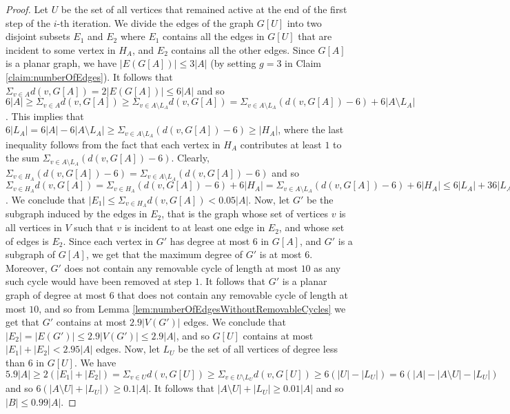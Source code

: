 \documentclass{article}
\theoremstyle{definition}
\begin{document}
\begin{proof}
Let $U$ be the set of all vertices that remained active at the end of the first step of the $i$-th iteration. We divide the edges of the graph $G[U]$ into two disjoint subsets $E_{1}$ and $E_{2}$ where $E_{1}$ contains all the edges in $G[U]$ that are incident to some vertex in $H_A$, and $E_{2}$ contains all the other edges. Since $G[A]$ is a planar graph, we have %
$|E(G[A])| \le 3|A|$ (by setting $g = 3$ in Claim \ref{claim:numberOfEdges}). It follows that $\Sigma_{v \in A}d(v, G[A]) = 2|E(G[A])| \le 6|A|$ and so $6|A| \ge \Sigma_{v \in A}d(v, G[A]) \ge \Sigma_{v \in A \setminus L_A} d(v, G[A]) = \Sigma_{v \in A \setminus L_A} (d(v, G[A]) - 6) + 6|A \setminus L_A|$. This implies that $6|L_A| = 6|A| - 6|A \setminus L_A| \ge \Sigma_{v \in A \setminus L_A} (d(v, G[A]) - 6) \ge |H_A|$, where the last inequality follows from the fact that each vertex in $H_A$ contributes at least $1$ to the sum $\Sigma_{v \in A \setminus L_A} (d(v, G[A]) - 6)$. Clearly, $\Sigma_{v \in H_A}(d(v, G[A]) - 6) = \Sigma_{v \in A \setminus L_A}(d(v, G[A]) - 6)$ and so $\Sigma_{v \in H_A}d(v, G[A]) = \Sigma_{v \in H_A}(d(v, G[A]) - 6) + 6|H_A| = \Sigma_{v \in  A \setminus L_A}(d(v, G[A]) - 6) + 6|H_A| \le 6|L_A| + 36|L_A| = 42|L_A| < 0.042|A| < 0.05|A|$. We conclude that $|E_{1}| \le \Sigma_{v \in H_A}d(v, G[A]) < 0.05|A|$. Now, let $G'$ be the subgraph induced by the edges in $E_{2}$, that is the graph whose set of vertices $v$ is all vertices in $V$ such that $v$ is incident to at least one edge in $E_2$, and whose set of edges is $E_2$. Since each vertex in $G'$ has degree at most $6$ in $G[A]$, and $G'$ is a subgraph of $G[A]$, we get that the maximum degree of $G'$ is at most $6$. Moreover, $G'$ does not contain any removable cycle of length at most $10$ as any such cycle would have been removed at step $1$. It follows that $G'$ is a planar graph of degree at most $6$ that does not contain any removable cycle of length at most $10$, and so from Lemma \ref{lem:numberOfEdgesWithoutRemovableCycles} we get that $G'$ contains at most $2.9|V(G')|$ edges. We conclude that $|E_2| = |E(G')| \le 2.9|V(G')| \le 2.9|A|$, and so $G[U]$ contains at most $|E_{1}| + |E_{2}| < 2.95|A|$ edges. Now, let $L_U$ be the set of all vertices of degree less than $6$ in $G[U]$. We have $5.9|A| \ge 2(|E_{1}| + |E_{2}|) = \Sigma_{v \in U}d(v, G[U]) \ge \Sigma_{v \in U \setminus L_U}d(v, G[U]) \ge 6(|U| - |L_U|) = 6(|A| - |A \setminus U| - |L_U|)$ and so $6(|A \setminus U| + |L_U|) \ge 0.1|A|$. It follows that $|A \setminus U| + |L_U| \ge 0.01|A|$ and so $|B| \le 0.99|A|$. %
\end{proof}
\end{document}
